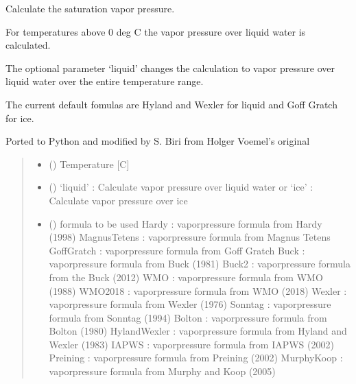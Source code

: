 \documentclass[letterpaper,10pt,english]{sphinxmanual}
\begin{document}
\begin{fulllineitems}
\label{\detokenize{users_guide:hum_subs.VaporPressure}}
\pysigstartsignatures
{}
\pysigstopsignatures
\sphinxAtStartPar
Calculate the saturation vapor pressure.

\sphinxAtStartPar
For temperatures above 0 deg C the vapor pressure over liquid water
is calculated.

\sphinxAtStartPar
The optional parameter ‘liquid’ changes the calculation to vapor pressure
over liquid water over the entire temperature range.

\sphinxAtStartPar
The current default fomulas are Hyland and Wexler for liquid and
Goff Gratch for ice.

\sphinxAtStartPar
Ported to Python and modified by S. Biri from Holger Voemel’s original
\begin{quote}\begin{description}
\begin{itemize}
\item {} 
\sphinxAtStartPar
{} () \textendash{} Temperature {[}C{]}

\item {} 
\sphinxAtStartPar
{} () \textendash{} ‘liquid’ : Calculate vapor pressure over liquid water or
‘ice’ : Calculate vapor pressure over ice

\item {} 
\sphinxAtStartPar
{} () \textendash{} formula to be used
Hardy               : vaporpressure formula from Hardy (1998)
MagnusTetens        : vaporpressure formula from Magnus Tetens
GoffGratch          : vaporpressure formula from Goff Gratch
Buck                : vaporpressure formula from Buck (1981)
Buck2               : vaporpressure formula from the Buck (2012)
WMO                 : vaporpressure formula from WMO (1988)
WMO2018             : vaporpressure formula from WMO (2018)
Wexler              : vaporpressure formula from Wexler (1976)
Sonntag             : vaporpressure formula from Sonntag (1994)
Bolton              : vaporpressure formula from Bolton (1980)
HylandWexler        : vaporpressure formula from Hyland and Wexler (1983)
IAPWS               : vaporpressure formula from IAPWS (2002)
Preining            : vaporpressure formula from Preining (2002)
MurphyKoop          : vaporpressure formula from Murphy and Koop (2005)


\end{itemize}
\end{description}
\end{quote}
\end{fulllineitems}
\end{document}
